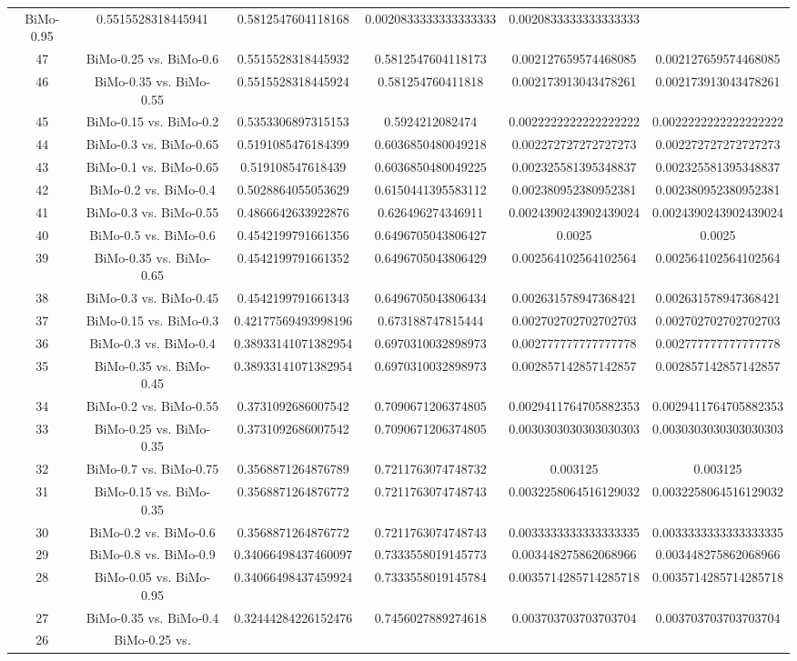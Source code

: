 \documentclass[a4paper,10pt]{article}
\begin{document}
\begin{landscape}
\begin{table}[!htp]
\begin{tabular}{cccccc}
BiMo-0.95&0.5515528318445941&0.5812547604118168&0.0020833333333333333&0.0020833333333333333\\47&BiMo-0.25 vs. BiMo-0.6&0.5515528318445932&0.5812547604118173&0.002127659574468085&0.002127659574468085\\46&BiMo-0.35 vs. BiMo-0.55&0.5515528318445924&0.581254760411818&0.002173913043478261&0.002173913043478261\\45&BiMo-0.15 vs. BiMo-0.2&0.5353306897315153&0.5924212082474&0.0022222222222222222&0.0022222222222222222\\44&BiMo-0.3 vs. BiMo-0.65&0.5191085476184399&0.6036850480049218&0.002272727272727273&0.002272727272727273\\43&BiMo-0.1 vs. BiMo-0.65&0.519108547618439&0.6036850480049225&0.002325581395348837&0.002325581395348837\\42&BiMo-0.2 vs. BiMo-0.4&0.5028864055053629&0.6150441395583112&0.002380952380952381&0.002380952380952381\\41&BiMo-0.3 vs. BiMo-0.55&0.4866642633922876&0.626496274346911&0.0024390243902439024&0.0024390243902439024\\40&BiMo-0.5 vs. BiMo-0.6&0.4542199791661356&0.6496705043806427&0.0025&0.0025\\39&BiMo-0.35 vs. BiMo-0.65&0.4542199791661352&0.6496705043806429&0.002564102564102564&0.002564102564102564\\38&BiMo-0.3 vs. BiMo-0.45&0.4542199791661343&0.6496705043806434&0.002631578947368421&0.002631578947368421\\37&BiMo-0.15 vs. BiMo-0.3&0.42177569493998196&0.673188747815444&0.002702702702702703&0.002702702702702703\\36&BiMo-0.3 vs. BiMo-0.4&0.38933141071382954&0.6970310032898973&0.002777777777777778&0.002777777777777778\\35&BiMo-0.35 vs. BiMo-0.45&0.38933141071382954&0.6970310032898973&0.002857142857142857&0.002857142857142857\\34&BiMo-0.2 vs. BiMo-0.55&0.3731092686007542&0.7090671206374805&0.0029411764705882353&0.0029411764705882353\\33&BiMo-0.25 vs. BiMo-0.35&0.3731092686007542&0.7090671206374805&0.0030303030303030303&0.0030303030303030303\\32&BiMo-0.7 vs. BiMo-0.75&0.3568871264876789&0.7211763074748732&0.003125&0.003125\\31&BiMo-0.15 vs. BiMo-0.35&0.3568871264876772&0.7211763074748743&0.0032258064516129032&0.0032258064516129032\\30&BiMo-0.2 vs. BiMo-0.6&0.3568871264876772&0.7211763074748743&0.0033333333333333335&0.0033333333333333335\\29&BiMo-0.8 vs. BiMo-0.9&0.34066498437460097&0.7333558019145773&0.003448275862068966&0.003448275862068966\\28&BiMo-0.05 vs. BiMo-0.95&0.34066498437459924&0.7333558019145784&0.0035714285714285718&0.0035714285714285718\\27&BiMo-0.35 vs. BiMo-0.4&0.32444284226152476&0.7456027889274618&0.003703703703703704&0.003703703703703704\\26&BiMo-0.25 vs. 
\end{tabular}
\end{table}
\end{landscape}
\end{document}

